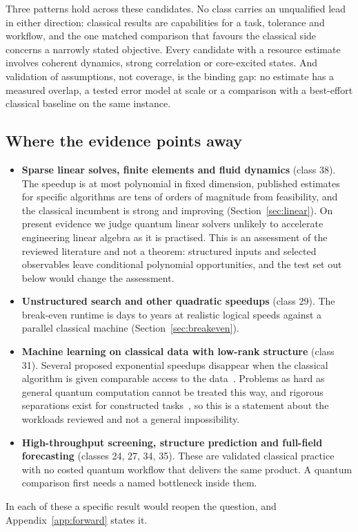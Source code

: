 Three patterns hold across these candidates. No class carries an unqualified lead in either direction: classical results are capabilities for a task, tolerance and workflow, and the one matched comparison that favours the classical side concerns a narrowly stated objective. Every candidate with a resource estimate involves coherent dynamics, strong correlation or core-excited states. And validation of assumptions, not coverage, is the binding gap: no estimate has a measured overlap, a tested error model at scale or a comparison with a best-effort classical baseline on the same instance.

\subsection{Where the evidence points away}
\begin{itemize}
\item \textbf{Sparse linear solves, finite elements and fluid dynamics} (class 38). The speedup is at most polynomial in fixed dimension, published estimates for specific algorithms are tens of orders of magnitude from feasibility, and the classical incumbent is strong and improving (Section~\ref{sec:linear}). On present evidence we judge quantum linear solvers unlikely to accelerate engineering linear algebra as it is practised. This is an assessment of the reviewed literature and not a theorem: structured inputs and selected observables leave conditional polynomial opportunities, and the test set out below would change the assessment.
\item \textbf{Unstructured search and other quadratic speedups} (class 29). The break-even runtime is days to years at realistic logical speeds against a parallel classical machine (Section~\ref{sec:breakeven}).
\item \textbf{Machine learning on classical data with low-rank structure} (class 31). Several proposed exponential speedups disappear when the classical algorithm is given comparable access to the data~\cite{tang2021,tang2023}. Problems as hard as general quantum computation cannot be treated this way, and rigorous separations exist for constructed tasks~\cite{liu2021}, so this is a statement about the workloads reviewed and not a general impossibility.
\item \textbf{High-throughput screening, structure prediction and full-field forecasting} (classes 24, 27, 34, 35). These are validated classical practice with no costed quantum workflow that delivers the same product. A quantum comparison first needs a named bottleneck inside them.
\end{itemize}
In each of these a specific result would reopen the question, and Appendix~\ref{app:forward} states it.

